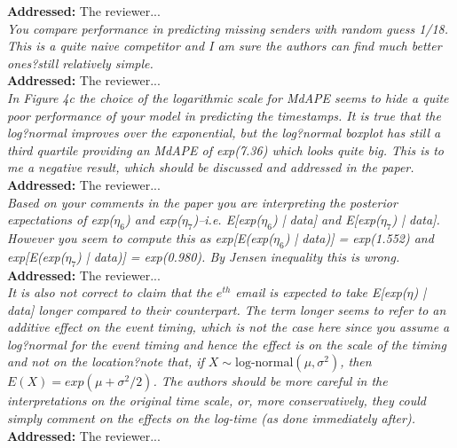 \documentclass[12pt]{article}
\newcommand{\grey}[1]{{\color{mygrey}#1}}
\theoremstyle{definition}
\begin{document}
\noindent \textcolor{MyGreen}{\textbf{Addressed:}} The reviewer... \\


 \grey{\emph{You compare performance in predicting missing senders with random guess 1/18. This is a quite naive competitor and I am sure the authors can find much better ones?still relatively simple.}}\\

\noindent \textcolor{MyGreen}{\textbf{Addressed:}} The reviewer... \\

 \grey{\emph{In Figure 4c the choice of the logarithmic scale for MdAPE seems to hide a quite poor performance of your model in predicting the timestamps. It is true that the log?normal improves over the exponential, but the log?normal boxplot has still a third quartile providing an MdAPE of exp(7.36) which looks quite big. This is to me a negative result, which should be discussed and addressed in the paper.}}\\

\noindent \textcolor{MyGreen}{\textbf{Addressed:}} The reviewer... \\



 \grey{\emph{Based on your comments in the paper you are interpreting the posterior expectations of exp($\eta_6$) and exp($\eta_7$)--i.e. E[exp($\eta_6$) | data] and E[exp($\eta_7$) | data]. However you seem to compute this as exp[E(exp($\eta_6$) | data)] = exp(1.552) and exp[E(exp($\eta_7$) | data)] = exp(0.980). By Jensen inequality this is wrong.}}\\

\noindent \textcolor{MyGreen}{\textbf{Addressed:}} The reviewer... \\

 \grey{\emph{It is also not correct to claim that the $e^{th}$ email is expected to take E[exp($\eta$) | data] longer compared to their counterpart. The term longer seems to refer to an additive effect on the event timing, which is not the case here since you assume a log?normal for the event timing and hence the effect is on the scale of the timing and not on the location?note that, if $X \sim \text{log-normal}(\mu, \sigma^2)$, then $E(X) = exp(\mu + \sigma^2/2)$. The authors should be more careful in the interpretations on the original time scale, or, more conservatively, they could simply comment on the effects on the log-time (as done immediately after).}}\\

\noindent \textcolor{MyGreen}{\textbf{Addressed:}} The reviewer... \\
\end{document}
